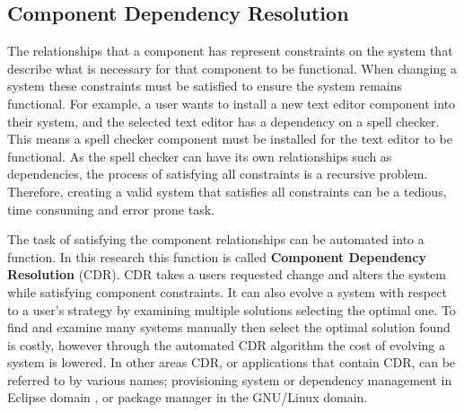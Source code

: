 \subsection{Component Dependency Resolution}
The relationships that a component has represent constraints on the system that describe what is necessary for that component to be functional.
When changing a system these constraints must be satisfied to ensure the system remains functional.
For example, a user wants to install a new text editor component into their system, and the selected text editor has a dependency on a spell checker.
This means a spell checker component must be installed for the text editor to be functional.
As the spell checker can have its own relationships such as dependencies, the process of satisfying all constraints is a recursive problem. 
Therefore, creating a valid system that satisfies all constraints can be a tedious, time consuming and error prone task.

The task of satisfying the component relationships can be automated into a function.
In this research this function is called \textbf{Component Dependency Resolution} (CDR).
CDR takes a users requested change and alters the system while satisfying component constraints.
It can also evolve a system with respect to a user's strategy by examining multiple solutions selecting the optimal one.
To find and examine many systems manually then select the optimal solution found is costly, however through the automated CDR algorithm the cost of evolving a system is lowered.
In other areas CDR, or applications that contain CDR, can be referred to by various names; provisioning system or dependency management in Eclipse domain \citep{leBerre2010},
or package manager in the GNU/Linux \citep{Barth2005} domain.

